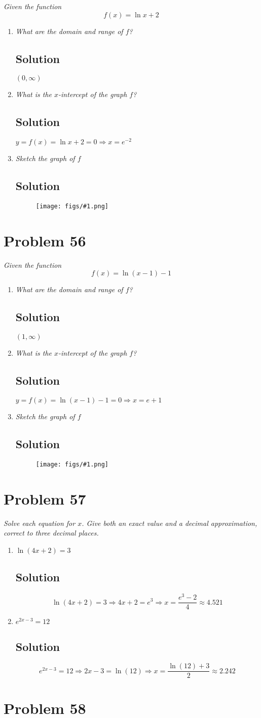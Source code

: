 \documentclass[11pt]{article}
\newcommand{\soln}{\subsection*}
\newcommand{\qn}{\textit}
\newcommand{\imgsoln}[1]{
	\begin{figure}[H]
		\centering
		\texttt{[image: figs/\#1.png]}
	\end{figure}
}
\begin{document}
\qn{Given the function $$f(x)=\ln{x}+2$$}
\begin{enumerate}
	\item \qn{What are the domain and range of $f$?}
	\soln{Solution}
	$(0, \infty)$
	
	\item \qn{What is the $x$-intercept of the graph $f$?}
	\soln{Solution}
	$y=f(x)=\ln{x}+2=0 \Rightarrow x = e^{-2}$
	
	\item \qn{Sketch the graph of $f$}
	\soln{Solution}
	\imgsoln{1.5.55-ans.c}
\end{enumerate}

\section*{Problem 56}

\qn{Given the function $$f(x)=\ln(x-1)-1$$}
\begin{enumerate}
	\item \qn{What are the domain and range of $f$?}
	\soln{Solution}
	$(1, \infty)$
	
	\item \qn{What is the $x$-intercept of the graph $f$?}
	\soln{Solution}
	$y=f(x)=\ln(x-1)-1=0 \Rightarrow x=e+1$
	
	\item \qn{Sketch the graph of $f$}
	\soln{Solution}
	\imgsoln{1.5.56-ans.c}
\end{enumerate}

\section*{Problem 57}

\qn{Solve each equation for $x$. Give both an exact value and a decimal approximation, correct to three decimal places.}
\begin{enumerate}
	\item \qn{$\ln(4x+2)=3$}
	\soln{Solution}
	$$\ln(4x+2)=3 \Rightarrow 4x+2=e^3 \Rightarrow x=\frac{e^3-2}{4}\approx4.521$$
	
	\item \qn{$e^{2x-3}=12$}
	\soln{Solution}
	$$e^{2x-3}=12 \Rightarrow 2x-3=\ln(12) \Rightarrow x=\frac{\ln(12)+3}{2}\approx2.242$$
\end{enumerate}

\section*{Problem 58}
\end{document}
